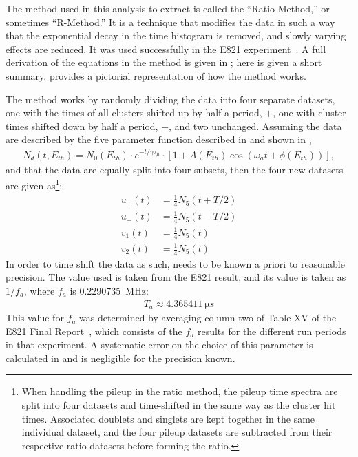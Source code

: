 
The method used in this analysis to extract \wa is called the ``Ratio Method,'' or sometimes ``R-Method.'' It is a technique that modifies the data in such a way that the exponential decay in the time histogram is removed, and slowly varying effects are reduced. It was used successfully in the E821 experiment~\cite{JKThesis,LDThesis,JPThesis}. A full derivation of the equations in the method is given in ; here is given a short summary.  provides a pictorial representation of how the method works.

The method works by randomly dividing the data into four separate datasets, one with the times of all clusters shifted up by half a \gmtwo period, $+$\Tatwo, one with cluster times shifted down by half a \gmtwo period, $-$\Tatwo, and two unchanged. Assuming the data are described by the five parameter function described in  and shown in , %
        \begin{align} \label{eq:5parfuncrepeated}
            N_{d}(t, E_{th}) = N_{0}(E_{th}) \cdot e^{-t/\gamma\tau_{\mu}} \cdot [1 + A(E_{th}) \cos(\omega_{a}t+\phi(E_{th}))],
        \end{align}
and that the data are equally split into four subsets, then the four new datasets are given as\footnote{When handling the pileup in the ratio method, the pileup time spectra are split into four datasets and time-shifted in the same way as the cluster hit times. Associated doublets and singlets are kept together in the same individual dataset, and the four pileup datasets are subtracted from their respective ratio datasets before forming the ratio.}:
    \begin{equation}
    \begin{aligned}
        u_{+}(t) &= \frac{1}{4} N_{5}(t+T/2) \\
        u_{-}(t) &= \frac{1}{4} N_{5}(t-T/2) \\
        v_{1}(t) &= \frac{1}{4} N_{5}(t) \\
        v_{2}(t) &= \frac{1}{4} N_{5}(t)
    \end{aligned}
    \end{equation}
In order to time shift the data as such, \Ta needs to be known a priori to reasonable precision. The value used is taken from the E821 result, and its value is taken as $1/f_{a}$, where $f_{a}$ is \SI{0.2290735}{MHz}:
        \begin{align}
            T_{a} \approx \SI{4.365411}{\micro s}
        \label{eq:Ta}
        \end{align}
This value for $f_{a}$ was determined by averaging column two of Table XV of the E821 Final Report~\cite{E821FinalReport}, which consists of the $f_{a}$ results for the different run periods in that experiment. A systematic error on the choice of this parameter is calculated in  and is negligible for the precision known.

